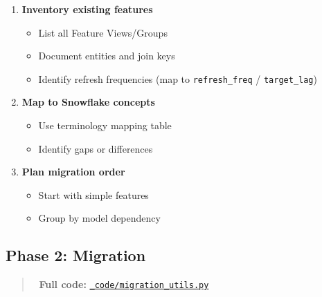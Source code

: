 \documentclass[
  letterpaper,
  DIV=11,
  numbers=noendperiod]{scrreprt}
\providecommand{\tightlist}{%
  \setlength{\itemsep}{0pt}\setlength{\parskip}{0pt}}\usepackage{longtable,booktabs,array}
\begin{document}
\begin{enumerate}
\def\labelenumi{\arabic{enumi}.}
\tightlist
\item
  \textbf{Inventory existing features}

  \begin{itemize}
  \tightlist
  \item
    List all Feature Views/Groups
  \item
    Document entities and join keys
  \item
    Identify refresh frequencies (map to \texttt{refresh\_freq} /
    \texttt{target\_lag})
  \end{itemize}
\item
  \textbf{Map to Snowflake concepts}

  \begin{itemize}
  \tightlist
  \item
    Use terminology mapping table
  \item
    Identify gaps or differences
  \end{itemize}
\item
  \textbf{Plan migration order}

  \begin{itemize}
  \tightlist
  \item
    Start with simple features
  \item
    Group by model dependency
  \end{itemize}
\end{enumerate}

\hypertarget{phase-2-migration}{%
\subsection{Phase 2: Migration}\label{phase-2-migration}}

\begin{quote}
📁 \textbf{Full code:}
\href{_code/migration_utils.py}{\texttt{\_code/migration\_utils.py}}
\end{quote}
\end{document}

